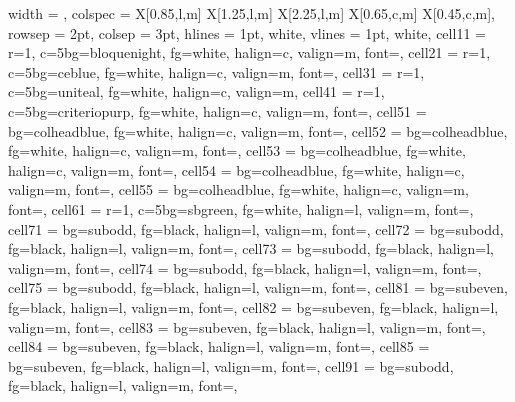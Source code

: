 \documentclass[a4paper,12pt]{article}
\begin{document}
\noindent
\begin{longtblr}{
  width      = \textwidth,
  colspec    = {X[0.85,l,m] X[1.25,l,m] X[2.25,l,m] X[0.65,c,m] X[0.45,c,m]},
  rowsep     = 2pt,
  colsep     = 3pt,
  hlines     = {1pt, white},
  vlines     = {1pt, white},
  cell{1}{1} = {r=1, c=5}{bg=bloquenight, fg=white, halign=c, valign=m, font=\bfseries},
  cell{2}{1} = {r=1, c=5}{bg=ceblue, fg=white, halign=c, valign=m, font=\small\bfseries},
  cell{3}{1} = {r=1, c=5}{bg=uniteal, fg=white, halign=c, valign=m},
  cell{4}{1} = {r=1, c=5}{bg=criteriopurp, fg=white, halign=c, valign=m, font=\small\bfseries},
  cell{5}{1} = {bg=colheadblue, fg=white, halign=c, valign=m, font=\bfseries},
  cell{5}{2} = {bg=colheadblue, fg=white, halign=c, valign=m, font=\bfseries},
  cell{5}{3} = {bg=colheadblue, fg=white, halign=c, valign=m, font=\bfseries},
  cell{5}{4} = {bg=colheadblue, fg=white, halign=c, valign=m, font=\bfseries},
  cell{5}{5} = {bg=colheadblue, fg=white, halign=c, valign=m, font=\bfseries},
  cell{6}{1} = {r=1, c=5}{bg=sbgreen, fg=white, halign=l, valign=m, font=\small\bfseries},
  cell{7}{1}  = {bg=subodd,  fg=black, halign=l, valign=m, font=\footnotesize},
  cell{7}{2}  = {bg=subodd,  fg=black, halign=l, valign=m, font=\footnotesize},
  cell{7}{3}  = {bg=subodd,  fg=black, halign=l, valign=m, font=\footnotesize},
  cell{7}{4}  = {bg=subodd,  fg=black, halign=l, valign=m, font=\footnotesize},
  cell{7}{5}  = {bg=subodd,  fg=black, halign=l, valign=m, font=\footnotesize},
  cell{8}{1}  = {bg=subeven, fg=black, halign=l, valign=m, font=\footnotesize},
  cell{8}{2}  = {bg=subeven, fg=black, halign=l, valign=m, font=\footnotesize},
  cell{8}{3}  = {bg=subeven, fg=black, halign=l, valign=m, font=\footnotesize},
  cell{8}{4}  = {bg=subeven, fg=black, halign=l, valign=m, font=\footnotesize},
  cell{8}{5}  = {bg=subeven, fg=black, halign=l, valign=m, font=\footnotesize},
  cell{9}{1}  = {bg=subodd,  fg=black, halign=l, valign=m, font=\footnotesize},
}
\end{longtblr}
\end{document}
